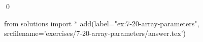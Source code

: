 
\begin{ex}
  \label{ex:7-20-array-parameters}
  
  \qed
\end{ex}
\begin{python0}
from solutions import *
add(label="ex:7-20-array-parameters",
    srcfilename='exercises/7-20-array-parameters/answer.tex')
\end{python0}
